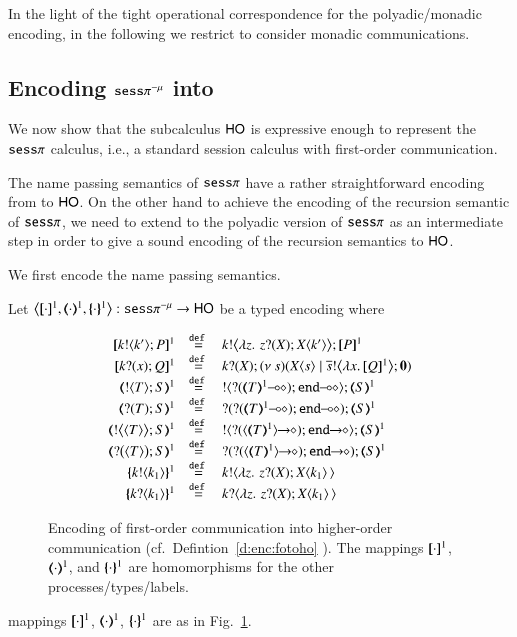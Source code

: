 In the light of the tight operational correspondence for the polyadic/monadic encoding,
in the following we restrict to consider monadic communications.

\subsection{Encoding $\mathtt{sess}\pi^{-\mu}$  into \HO}

We now show that the subcalculus $\mathsf{HO}$ is expressive enough to
represent the $\mathtt{sess}\pi$ calculus, i.e., a standard  session calculus with first-order communication.


The name passing semantics of $\mathtt{sess}\pi$ have a rather straightforward
encoding from to $\mathsf{HO}$.
On the other hand to achieve the encoding of the recursion semantic
of $\mathtt{sess}\pi$, we need to extend
to the polyadic version of $\mathtt{sess}\pi$ as an intermediate step in order
to give a sound encoding of the recursion semantics to $\mathsf{HO}$.

We first encode the name passing semantics.

\begin{definition}\label{d:enc:fotoho}
   Let  $\enco{\map{\cdot}^{1}, \mapt{\cdot}^{1}, \mapa{\cdot}^{1}}: \sessp^{-\mu} \to \HO$ be a typed encoding where
\begin{figure}[t]
	\[
	\begin{array}{rcl}
		\pmap{\bout{k}{k'} P}{1}		&\defeq&	\bbout{k}{ \abs{z}{\,\binp{z}{X} \appl{X}{k'}} } \pmap{P}{1} \\
		\pmap{\binp{k}{x} Q}{1}			&\defeq&	\binp{k}{X} \newsp{s}{\appl{X}{s} \Par \bbout{\dual{s}}{\abs{x}{\pmap{Q}{1}}} \inact} \\
		\tmap{\btout{T} {S} }{1}		&\defeq&	\btout{\lhot{\btinp{\lhot{\tmap{T}{1}}}\tinact}} \tmap{S}{1}  \\
		\tmap{\btinp{T} S }{1}		&\defeq&	\btinp{\lhot{\btinp{\lhot{\tmap{T}{1}}}\tinact}} \tmap{S}{1} \\
		\tmap{\bbtout{\chtype{T}}{S}}{1}	&\defeq&	\btout{\shot{\btinp{\shot{\chtype{\tmap{T}{1}}}}\tinact}} \tmap{S}{1}  \\
		\tmap{\bbtinp{\chtype{T}}{S}}{1}	&\defeq&	\btinp{\shot{\btinp{\shot{\chtype{\tmap{T}{1}}}}\tinact}} \tmap{S}{1}  \\
		\mapa{\bactout{k}{k_1}}^{1} &\defeq&   \bactout{k}{\abs{z}{\,\binp{z}{X} \appl{X}{k_1}}\, } \\
		\mapa{\bactinp{k}{k_1}}^{1} &\defeq&   \bactinp{k}{\abs{z}{\,\binp{z}{X} \appl{X}{k_1}}\, }
	\end{array}
	\]
	\caption{
Encoding of first-order communication into higher-order communication (cf.~Defintion~\ref{d:enc:fotoho} \label{f:enc:fotoho}).
The mappings 
$[\!\![\cdot]\!\!]^1$,
$(\!\!\langle\cdot\rangle\!\!)^1$, 
and 
$\{\!\!\{\cdot\}\!\!\}^1$
are homomorphisms for the other processes/types/labels. 
}
\end{figure}
mappings $[\!\![\cdot]\!\!]^{1}$, $(\!\!\langle\cdot\rangle\!\!)^{1}$, $\{\!\!\{\cdot\}\!\!\}^{1}$
are 
as in Fig.~\ref{f:enc:fotoho}.
\end{definition}

